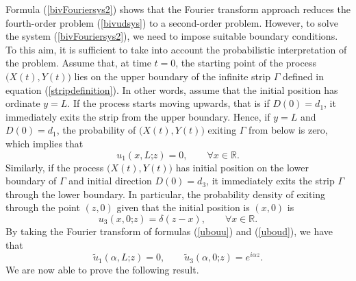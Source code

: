 \documentclass{article}
\begin{document}
Formula (\ref{bivFouriersys2}) shows that the Fourier transform approach reduces the fourth-order problem (\ref{bivudsys}) to a second-order problem. However, to solve the system (\ref{bivFouriersys2}), we need to impose suitable boundary conditions. To this aim, it is sufficient to take into account the probabilistic interpretation of the problem. Assume that, at time $t=0$, the starting point of the process $\big(X(t),Y(t)\big)$ lies on the upper boundary of the infinite strip $\Gamma$ defined in equation (\ref{stripdefinition}). In other words, assume that the initial position has ordinate $y=L$. If the process starts moving upwards, that is if $D(0)=d_1$, it immediately exits the strip from the upper boundary. Hence, if $y=L$ and $D(0)=d_1$, the probability of $\big(X(t),Y(t)\big)$ exiting $\Gamma$ from below is zero, which implies that \begin{equation}u_1(x,L\mathord{;}z)=0,\qquad \forall x\in\mathbb{R}.\label{ubouu}\end{equation}
Similarly, if the process $\big(X(t),Y(t)\big)$ has initial position on the lower boundary of $\Gamma$ and initial direction $D(0)=d_3$, it immediately exits the strip $\Gamma$ through the lower boundary. In particular, the probability density of exiting through the point $(z,0)$ given that the initial position is $(x,0)$ is
\begin{equation}\label{uboud}u_3(x,0\mathord{;}z)=\delta(z-x),\qquad\forall x\in\mathbb{R}.\end{equation}
By taking the Fourier transform of formulas (\ref{ubouu}) and (\ref{uboud}), we have that
\begin{equation}\label{stripboundarycon}\widetilde{u}_1(\alpha,L\mathord{;}z)=0,\qquad \widetilde{u}_3(\alpha,0\mathord{;}z)=e^{i\alpha z}.\end{equation}
We are now able to prove the following result.
\end{document}
